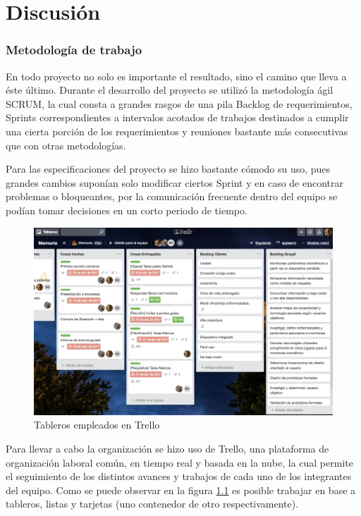 \chapter{Discusión}\label{discusion}

\subsection{Metodología de trabajo}

En todo proyecto no solo es importante el resultado, sino el camino que lleva a éste último. Durante el desarrollo del proyecto se utilizó la metodología ágil SCRUM, la cual consta a grandes rasgos de una pila Backlog de requerimientos, Sprints correspondientes a intervalos acotados de trabajos destinados a cumplir una cierta porción de los requerimientos y reuniones bastante más consecutivas que con otras metodologías. 

Para las especificaciones del proyecto se hizo bastante cómodo su uso, pues grandes cambios suponían solo modificar ciertos Sprint y en caso de encontrar problemas o bloqueantes, por la comunicación frecuente dentro del equipo se podían tomar decisiones en un corto periodo de tiempo.

\begin{figure}[H]
	\centering
	\includegraphics[scale=0.3]{figuras/discusion/trello.png}
	\caption{Tableros empleados en Trello}
	\label{trello}
\end{figure}


Para llevar a cabo la organización se hizo uso de Trello, una plataforma de organización laboral común, en tiempo real y basada en la nube, la cual permite el seguimiento de los distintos avances y trabajos de cada uno de los integrantes del equipo. Como se puede observar en la figura \ref{trello} es posible trabajar en base a tableros, listas y tarjetas (uno contenedor de otro respectivamente).


